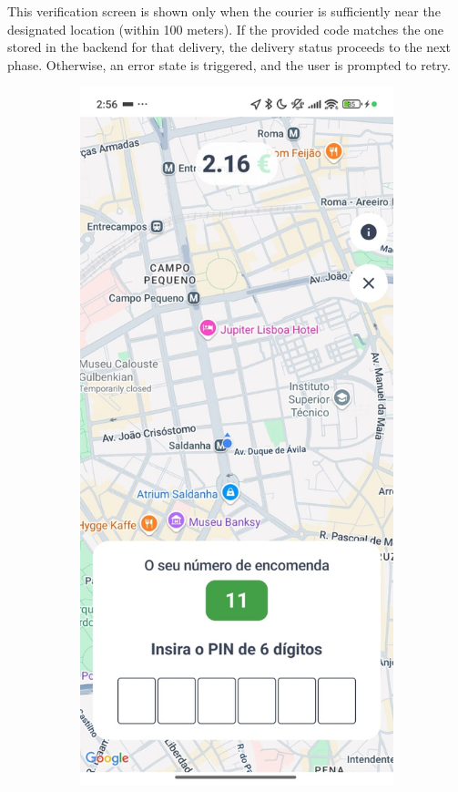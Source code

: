 This verification screen is shown only when the courier is sufficiently near the designated location (within 100 meters). If the provided code matches the one stored in the backend for that delivery, the delivery status proceeds to the next phase. Otherwise, an error state is triggered, and the user is prompted to retry.

\begin{figure}[H]
    \begin{subfigure}[b]{0.43\textwidth}
        \centering
        \includegraphics[width=\textwidth]{images/pickup_pin_screen.jpeg}

\end{subfigure}
\end{figure}
